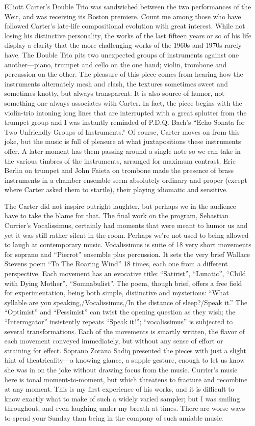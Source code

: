 Elliott Carter’s Double Trio was sandwiched between the two performances of the Weir, and was receiving its Boston premiere. Count me among those who have followed Carter’s late-life compositional evolution with great interest. While not losing his distinctive personality, the works of the last fifteen years or so of his life display a clarity that the more challenging works of the 1960s and 1970s rarely have. The Double Trio pits two unexpected groups of instruments against one another—piano, trumpet and cello on the one hand; violin, trombone and percussion on the other. The pleasure of this piece comes from hearing how the instruments alternately mesh and clash, the textures sometimes sweet and sometimes knotty, but always transparent. It is also source of humor, not something one always associates with Carter. In fact, the piece begins with the violin-trio intoning long lines that are interrupted with a great splutter from the trumpet group and I was instantly reminded of P.D.Q. Bach’s “Echo Sonata for Two Unfriendly Groups of Instruments.” Of course, Carter moves on from this joke, but the music is full of pleasure at what juxtapositions these instruments offer. A later moment has them passing around a single note so we can take in the various timbres of the instruments, arranged for maximum contrast. Eric Berlin on trumpet and John Faieta on trombone made the presence of brass instruments in a chamber ensemble seem absolutely ordinary and proper (except where Carter asked them to startle), their playing idiomatic and sensitive.

The Carter did not inspire outright laughter, but perhaps we in the audience have to take the blame for that. The final work on the program, Sebastian Currier’s Vocalissimus, certainly had moments that were meant to humor us and yet it was still rather silent in the room. Perhaps we’re not used to being allowed to laugh at contemporary music. Vocalissimus is suite of 18 very short movements for soprano and “Pierrot” ensemble plus percussion. It sets the very brief Wallace Stevens poem “To The Roaring Wind” 18 times, each one from a different perspective. Each movement has an evocative title: “Satirist”, “Lunatic”, “Child with Dying Mother”, “Somnabulist”. The poem, though brief, offers a free field for experimentation, being both simple, distinctive and mysterious: “What syllable are you speaking,/Vocalissimus,/In the distance of sleep?/Speak it.” The “Optimist” and “Pessimist” can twist the opening question as they wish; the “Interrogator” insistently repeats “Speak it!”; “vocalissimus” is subjected to several transformations. Each of the movements is smartly written, the flavor of each movement conveyed immediately, but without any sense of effort or straining for effect. Soprano Zorana Sadiq presented the pieces with just a slight hint of theatricality—a knowing glance, a supple gesture, enough to let us know she was in on the joke without drawing focus from the music. Currier’s music here is tonal moment-to-moment, but which threatens to fracture and recombine at any moment. This is my first experience of his works, and it is difficult to know exactly what to make of such a widely varied sampler; but I was smiling throughout, and even laughing under my breath at times. There are worse ways to spend your Sunday than being in the company of such amiable music.
